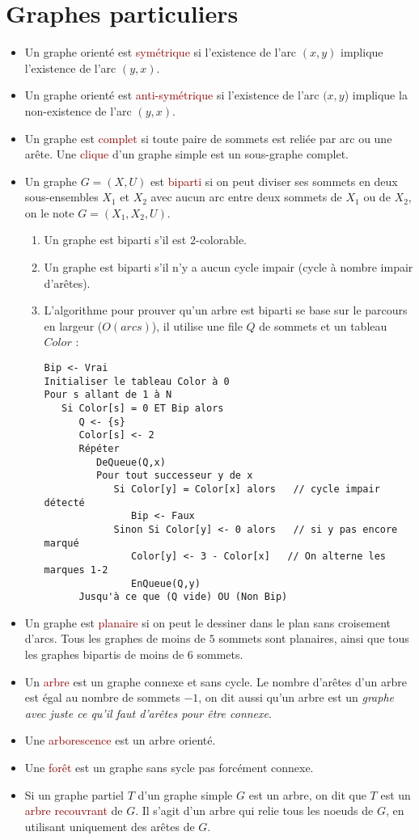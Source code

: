 \documentclass{article}
\newcommand{\red}[1]{\textcolor{darkred}{#1}}
\begin{document}
\section{Graphes particuliers}
\noindent\begin{itemize}
\item Un graphe orienté est \red{symétrique} si l'existence de l'arc $(x,y)$ implique l'existence de l'arc $(y,x)$.
\item Un graphe orienté est \red{anti-symétrique} si l'existence de l'arc $(x,y$) implique la non-existence de l'arc $(y,x)$.
\item Un graphe est \red{complet} si toute paire de sommets est reliée par arc ou une arête. Une \red{clique} d'un graphe simple est un sous-graphe complet.
\item Un graphe $G=(X,U)$ est \red{biparti} si on peut diviser ses sommets en deux sous-ensembles $X_1$ et $X_2$ avec aucun arc entre deux sommets de $X_1$ ou de $X_2$, 
on le note $G=(X_1,X_2,U)$.
\begin{enumerate}
\item Un graphe est biparti s'il est $2$-colorable.
\item Un graphe est biparti s'il n'y a aucun cycle impair (cycle à nombre impair d'arêtes).
\item L'algorithme pour prouver qu'un arbre est biparti se base sur le parcours en largeur ($O(arcs)$), il utilise une file $Q$ de sommets et un tableau $Color$ :
\begin{verbatim}
Bip <- Vrai
Initialiser le tableau Color à 0
Pour s allant de 1 à N
   Si Color[s] = 0 ET Bip alors
      Q <- {s}
      Color[s] <- 2
      Répéter
         DeQueue(Q,x)
         Pour tout successeur y de x
            Si Color[y] = Color[x] alors   // cycle impair détecté
               Bip <- Faux
            Sinon Si Color[y] <- 0 alors   // si y pas encore marqué
               Color[y] <- 3 - Color[x]   // On alterne les marques 1-2
               EnQueue(Q,y)
      Jusqu'à ce que (Q vide) OU (Non Bip)     
\end{verbatim}
\end{enumerate}
\item Un graphe est \red{planaire} si on peut le dessiner dans le plan sans croisement d'arcs. Tous les graphes de moins de $5$ sommets sont planaires, ainsi que tous les graphes 
bipartis de moins de $6$ sommets.
\item Un \red{arbre} est un graphe connexe et sans cycle. Le nombre d'arêtes d'un arbre est égal au nombre de sommets $-1$, on dit aussi qu'un arbre est un \textit{graphe avec 
juste ce qu'il faut d'arêtes pour être connexe}.
\item Une \red{arborescence} est un arbre orienté.
\item Une \red{forêt} est un graphe sans sycle pas forcément connexe.
\item Si un graphe partiel $T$ d'un graphe simple $G$ est un arbre, on dit que $T$ est un \red{arbre recouvrant} de $G$. Il s'agit d'un arbre qui relie tous les noeuds de $G$, en 
utilisant uniquement des arêtes de $G$.
\end{itemize}
\end{document}
